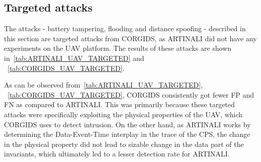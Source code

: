 \subsection{Targeted attacks}
The attacks - battery tampering, flooding and distance spoofing - described in this section are targeted attacks from CORGIDS, as ARTINALI did not have any experiments on the UAV platform.
The results of these attacks are shown in~\autoref{tab:ARTINALI_UAV_TARGETED} and ~\autoref{tab:CORGIDS_UAV_TARGETED}.

\begin{table}
\centering
  \caption{Results of intrusion detection by ARTINALI for Targeted attacks on UAV platform}
  \label{tab:ARTINALI_UAV_TARGETED}
\end{table}

\begin{table}
\centering
  \caption{Results of intrusion detection by CORGIDS for Targeted attacks on UAV platform}
  \label{tab:CORGIDS_UAV_TARGETED}
\end{table}

As can be observed from~\autoref{tab:ARTINALI_UAV_TARGETED}, ~\autoref{tab:CORGIDS_UAV_TARGETED}, CORGIDS consistently got fewer FP and FN as compared to ARTINALI. This was primarily because these targeted attacks were specifically exploiting the physical properties of the UAV, which CORGIDS uses to detect intrusion. On the other hand, as ARTINALI works by determining the Data-Event-Time interplay in the trace of the CPS, the change in the physical property did not lead to sizable change in the data part of the invariants, which ultimately led to a lesser detection rate for ARTINALI.


